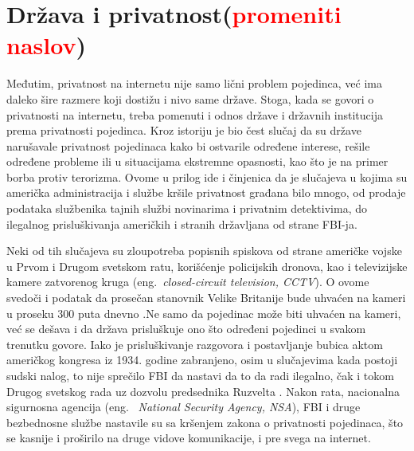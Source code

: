 \documentclass[a4paper]{article}
\newcommand\todos[1]{\textcolor{red}{#1}}
\begin{document}
\section{Država i privatnost(\todos{promeniti naslov})}	
\label{sec:drugoPoglavlje}
\par Međutim, privatnost na internetu nije samo lični problem pojedinca, već ima daleko šire razmere koji dostižu i nivo same države. Stoga, kada se govori o privatnosti na internetu, treba pomenuti i odnos države i državnih institucija prema privatnosti pojedinca. Kroz istoriju je bio čest slučaj da su države narušavale  privatnost pojedinaca kako bi ostvarile određene interese, rešile određene probleme ili u situacijama ekstremne opasnosti, kao što je na primer borba protiv terorizma. Ovome u prilog ide i činjenica da je slučajeva u kojima su američka administracija i službe kršile privatnost građana bilo mnogo, od prodaje podataka službenika tajnih službi novinarima i privatnim detektivima, do ilegalnog prisluškivanja američkih i stranih državljana od strane FBI-ja.
\par Neki od tih slučajeva su zloupotreba popisnih spiskova od strane američke vojske u Prvom i Drugom svetskom ratu, korišćenje policijskih dronova, kao i televizijske kamere zatvorenog kruga (eng.~{\em closed-circuit television, CCTV}). O ovome svedoči i podatak da prosečan stanovnik Velike Britanije bude uhvaćen na kameri u proseku 300 puta dnevno \cite{ethics, london}.Ne samo da pojedinac može biti uhvaćen na kameri, već se dešava i da država prisluškuje ono što određeni pojedinci u svakom trenutku govore. Iako je prisluškivanje razgovora i postavljanje bubica aktom američkog kongresa iz 1934. godine zabranjeno, osim u slučajevima kada postoji sudski nalog, to nije sprečilo FBI da nastavi da to da radi ilegalno, čak i tokom Drugog svetskog rada uz dozvolu predsednika Ruzvelta \cite{ruzvelt}. Nakon rata, nacionalna sigurnosna agencija (eng. ~{\em National Security Agency, NSA}), FBI i druge bezbednosne službe nastavile su sa kršenjem zakona o privatnosti pojedinaca, što se kasnije i proširilo na druge vidove komunikacije, i pre svega na internet.
\end{document}
